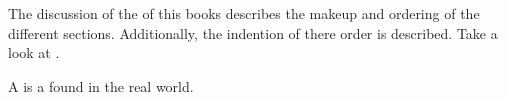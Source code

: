 \documentclass[crop=false,class=scrbook]{standalone}
\begin{document}
The discussion of the  of this books describes the makeup and ordering
of the different sections.
Additionally, the indention of there order is described.
Take a look at .

\begin{defn}[\g{pnt}]
	A  is a  found in the real world.
\end{defn}
\end{document}
